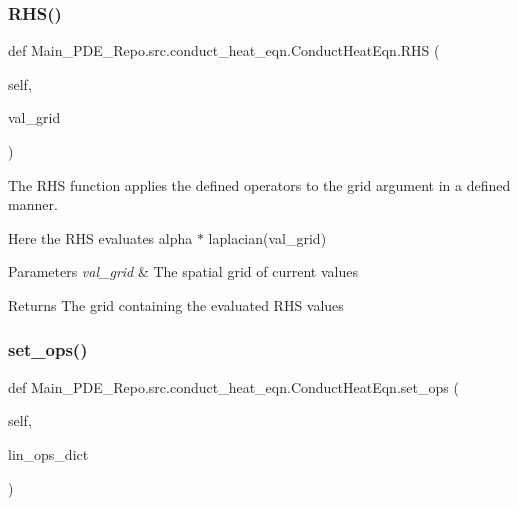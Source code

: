 \subsubsection{\texorpdfstring{R\+H\+S()}{RHS()}}
{\footnotesize\ttfamily def Main\+\_\+\+P\+D\+E\+\_\+\+Repo.\+src.\+conduct\+\_\+heat\+\_\+eqn.\+Conduct\+Heat\+Eqn.\+R\+HS (\begin{DoxyParamCaption}\item[{}]{self,  }\item[{}]{val\+\_\+grid }\end{DoxyParamCaption})}



The R\+HS function applies the defined operators to the grid argument in a defined manner. 

Here the R\+HS evaluates alpha $\ast$ laplacian(val\+\_\+grid) 
\begin{DoxyParams}{Parameters}
{\em val\+\_\+grid} & The spatial grid of current values \\
\hline
\end{DoxyParams}
\begin{DoxyReturn}{Returns}
The grid containing the evaluated R\+HS values 
\end{DoxyReturn}
\mbox{\label{classMain__PDE__Repo_1_1src_1_1conduct__heat__eqn_1_1ConductHeatEqn_a9733763f77bf263a466bb08effec78ab}} 
\subsubsection{\texorpdfstring{set\+\_\+ops()}{set\_ops()}}
{\footnotesize\ttfamily def Main\+\_\+\+P\+D\+E\+\_\+\+Repo.\+src.\+conduct\+\_\+heat\+\_\+eqn.\+Conduct\+Heat\+Eqn.\+set\+\_\+ops (\begin{DoxyParamCaption}\item[{}]{self,  }\item[{}]{lin\+\_\+ops\+\_\+dict }\end{DoxyParamCaption})}



